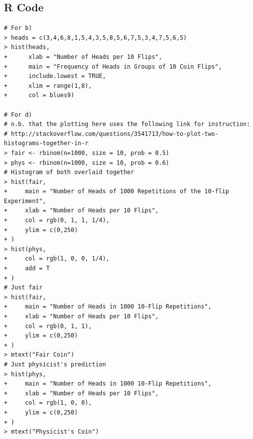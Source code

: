 \documentclass{article}
\begin{document}
\subsection*{R Code}
\begin{verbatim}
# For b)
> heads = c(3,4,6,8,1,5,4,3,5,8,5,6,7,5,3,4,7,5,6,5)
> hist(heads,
+      xlab = "Number of Heads per 10 Flips",
+      main = "Frequency of Heads in Groups of 10 Coin Flips",
+      include.lowest = TRUE,
+      xlim = range(1,8),
+      col = blues9)

# For d)
# n.b. that the plotting here uses the following link for instruction:
# http://stackoverflow.com/questions/3541713/how-to-plot-two-histograms-together-in-r
> fair <- rbinom(n=1000, size = 10, prob = 0.5)
> phys <- rbinom(n=1000, size = 10, prob = 0.6)
# Histogram of both overlaid together
> hist(fair,
+     main = "Number of Heads of 1000 Repetitions of the 10-flip Experiment",
+     xlab = "Number of Heads per 10 Flips",
+     col = rgb(0, 1, 1, 1/4),
+     ylim = c(0,250)
+ )
> hist(phys,
+     col = rgb(1, 0, 0, 1/4),
+     add = T
+ )
# Just fair
> hist(fair,
+     main = "Number of Heads in 1000 10-Flip Repetitions",
+     xlab = "Number of Heads per 10 Flips",
+     col = rgb(0, 1, 1),
+     ylim = c(0,250)
+ )
> mtext("Fair Coin")
# Just physicist's prediction
> hist(phys,
+     main = "Number of Heads in 1000 10-Flip Repetitions",
+     xlab = "Number of Heads per 10 Flips",
+     col = rgb(1, 0, 0),
+     ylim = c(0,250)
+ )
> mtext("Physicist's Coin")
\end{verbatim}
\end{document}
